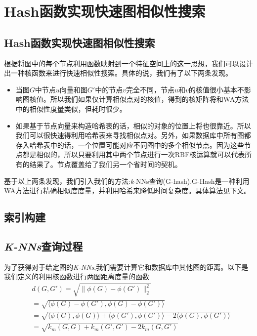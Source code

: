 \documentclass{article}
\begin{document}
\section{Hash函数实现快速图相似性搜索}
\else
\subsection{Hash函数实现快速图相似性搜索}
\fi
根据将图中的每个节点利用函数映射到一个特征空间上的这一思想，我们可以设计出一种核函数来进行快速相似性搜索。具体的说，我们有了以下两条发现。
\begin{itemize}
    \item 当图$G$中节点$u$向量和图$G'$中的节点$v$完全不同，节点$u$和$v$的核值很小基本不影响图核值。所以我们如果仅计算相似点对的核值，得到的核矩阵将和WA方法中的相似性度量类似，但耗时很少。
    \item 如果基于节点向量来构造哈希表的话，相似的对象的位置上将也很靠近。所以我们可以很快速得利用哈希表来寻找相似点对。另外，如果数据库中所有图都存入哈希表中的话，一个位置可能对应不同图中的多个相似节点。因为这些节点都是相似的，所以只要利用其中两个节点进行一次RBF核运算就可以代表所有的结果了。节点覆盖给了我们另一个省时间的契机。
\end{itemize}

基于以上两条发现，我们引入我们的方法:\emph{k}-NNs查询(G-hash).G-Hash是一种利用WA方法进行精确相似度度量，并利用哈希来降低时间复杂度。具体算法见下文。
\subsection{索引构建}

\subsection{\emph{K-NNs}查询过程}
为了获得对于给定图的\emph{K-NNs},我们需要计算它和数据库中其他图的距离。以下是我们定义的利用核函数进行两图距离度量的函数
\begin{equation}
\begin{split}
    &d(G,G')=\sqrt{\|\phi(G)-\phi(G')\|_{2}^{2}}\\
              &=\sqrt{\langle\phi(G)-\phi(G'),\phi(G)-\phi(G')\rangle}\\
              &=\sqrt{\langle\phi(G),\phi(G)\rangle+\langle\phi(G'),\phi(G')\rangle-2\langle\phi(G),\phi(G')\rangle}\\
              &=\sqrt{k_{m}(G,G)+k_{m}(G',G')-2k_{m}(G,G')}
\end{split}
\end{equation}
\end{document}
